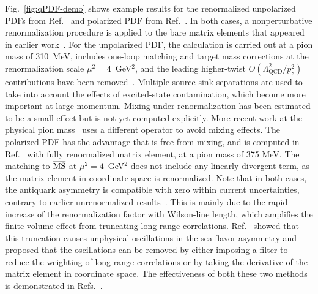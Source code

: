 Fig.~\ref{fig:qPDF-demo} shows example results for the renormalized unpolarized 
PDFs from Ref.~\cite{Chen:2017mzz} and polarized PDF from 
Ref.~\cite{Alexandrou:2017huk}.
In both cases, a nonperturbative renormalization procedure is applied to the 
bare matrix elements that appeared in earlier work~\cite{Lin:2014zya,
Alexandrou:2015rja,Chen:2016utp,Alexandrou:2016jqi,Alexandrou:2016eyt}.
%
For the unpolarized PDF, the calculation is carried out at a pion mass of 
310~MeV, includes one-loop matching and target mass corrections at the 
renormalization scale $\mu^2=4$~GeV$^2$, and the leading higher-twist 
$O(\Lambda_\text{QCD}^2/p_z^2)$ contributions have been 
removed~\cite{Chen:2016utp}. 
%
Multiple source-sink separations are used to take into account the effects of 
excited-state contamination, which become more important at large momentum. 
%
Mixing under renormalization has been estimated to be a small effect but is not 
yet computed explicitly. 
%
More recent work at the physical pion mass~\cite{Lin:2017ani} uses a different 
operator to avoid mixing effects. 
%
The polarized PDF has the advantage that is free from mixing, and is computed in
Ref.~\cite{Alexandrou:2017huk}  with fully renormalized matrix element, 
at a pion mass of 375 MeV. 
%
The matching to $\overline{\rm MS}$ at $\mu^2=4$~GeV$^2$ does not include any 
linearly divergent term, as the matrix element in 
coordinate space is renormalized.
% 
Note that in both cases, the antiquark asymmetry is compatible with zero 
within current uncertainties, contrary to earlier unrenormalized 
results~\cite{Lin:2014zya,Alexandrou:2015rja,Chen:2016utp,Alexandrou:2016eyt}.
%
This is mainly due to the rapid increase of the renormalization factor with 
Wilson-line length, which amplifies the finite-volume effect from truncating 
long-range correlations. 
%
Ref.~\cite{Lin:2017ani} showed that this truncation causes unphysical 
oscillations in the sea-flavor asymmetry and proposed that the oscillations 
can be removed by either imposing a filter to reduce the weighting of 
long-range correlations or by taking the derivative of the matrix element in 
coordinate space. 
%
The effectiveness of both these two methods is 
demonstrated in Refs.~\cite{Alexandrou:2017dzj,Lin:2017ani}. 

